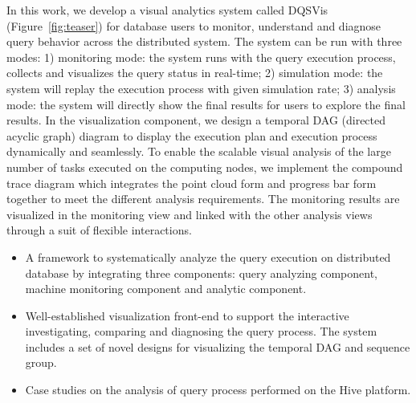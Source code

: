 In this work, we develop a visual analytics system called DQSVis (Figure~\ref{fig:teaser}) for database users to monitor, understand and diagnose query behavior across the distributed system. The system can be run with three modes: 1) monitoring mode: the system runs with the query execution process, collects and visualizes the query status in real-time; 2) simulation mode: the system will replay the execution process with given simulation rate; 3) analysis mode: the system will directly show the final results for users to explore the final results. In the visualization component, we design a temporal DAG (directed acyclic graph) diagram to display the execution plan and execution process dynamically and seamlessly. To enable the scalable visual analysis of the large number of tasks executed on the computing nodes, we implement the compound trace diagram which integrates the point cloud form and progress bar form together to meet the different analysis requirements. The monitoring results are visualized in the monitoring view and linked with the other analysis views through a suit of flexible interactions. 


\begin{itemize}
\item A framework to systematically analyze the query execution on distributed database by integrating three components: query analyzing component, machine monitoring component and analytic component.
\item Well-established visualization front-end to support the interactive investigating, comparing and diagnosing the query process. The system includes a set of novel designs for visualizing the temporal DAG and sequence group.
\item Case studies on the analysis of query process performed on the Hive platform.
\end{itemize}